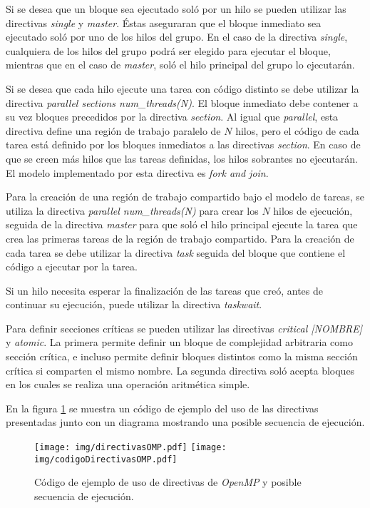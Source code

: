 Si se desea que un bloque sea ejecutado soló por un hilo se pueden utilizar las
directivas \emph{single} y \emph{master}. Éstas aseguraran que el bloque
inmediato sea ejecutado soló por uno de los hilos del grupo. En el caso de la
directiva \emph{single}, cualquiera de los hilos del grupo podrá ser elegido
para ejecutar el bloque, mientras que en el caso de \emph{master}, soló el
hilo principal del grupo lo ejecutarán.

Si se desea que cada hilo ejecute una tarea con código distinto se debe utilizar
la directiva \emph{parallel sections num\_threads(N)}. El bloque inmediato debe
contener a su vez bloques precedidos por la directiva \emph{section}. Al igual
que \emph{parallel}, esta directiva define una región de trabajo paralelo de $N$
hilos, pero el código de cada tarea está definido por los bloques inmediatos a
las directivas \emph{section}. En caso de que se creen más hilos que las tareas
definidas, los hilos sobrantes no ejecutarán. El modelo implementado por esta
directiva es \emph{fork and join}.

Para la creación de una región de trabajo compartido bajo el modelo de tareas, se
utiliza la directiva \emph{parallel num\_threads(N)} para crear los $N$ hilos de
ejecución, seguida de la directiva \emph{master} para que soló el hilo principal
ejecute la tarea que crea las primeras tareas de la región de trabajo
compartido. Para la creación de cada tarea se debe utilizar la directiva
\emph{task} seguida del bloque que contiene el código a ejecutar por la tarea.

Si un hilo necesita esperar la finalización de las tareas que creó, antes de
continuar su ejecución, puede utilizar la directiva \emph{taskwait}.

Para definir secciones críticas se pueden utilizar las directivas \emph{critical
[NOMBRE]} y \emph{atomic}. La primera permite definir un bloque de complejidad
arbitraria como sección crítica, e incluso permite definir bloques distintos
como la misma sección crítica si comparten el mismo nombre. La segunda directiva
soló acepta bloques en los cuales se realiza una operación aritmética simple.

En la figura \ref{directivas} se muestra un código de ejemplo del uso de las
directivas presentadas junto con un diagrama mostrando una posible secuencia
de ejecución.

\begin{figure}[h]

	\centering

	\texttt{[image: img/directivasOMP.pdf]}
	\texttt{[image: img/codigoDirectivasOMP.pdf]}

	\caption{Código de ejemplo de uso de directivas de \emph{OpenMP} y
	posible secuencia de ejecución.}

	\label{directivas}

\end{figure}
